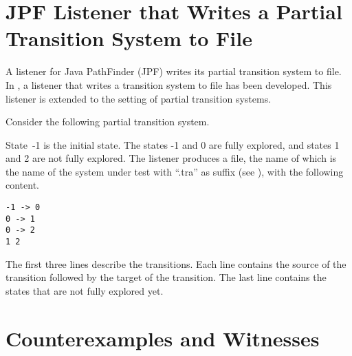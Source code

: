 \documentclass[12pt]{article}
\theoremstyle{definition}
\begin{document}
\section{JPF Listener that Writes a Partial Transition System to File}

A listener for Java PathFinder (JPF) writes its partial transition system to file.  In \cite[Section~7.3]{B20}, a listener that writes a transition system to file has been developed.  This listener is extended to the setting of partial transition systems.

Consider the following partial transition system.
\begin{center}
\end{center}
State~-1 is the initial state.  The states -1 and 0 are fully explored, and  states 1 and 2 are not fully explored.  The listener produces a file, the name of which is the name of the system under test with ``.tra'' as suffix (see \cite[Section 7.4]{B20}), with the following content.
\begin{verbatim}
-1 -> 0
0 -> 1
0 -> 2
1 2
\end{verbatim}
The first three lines describe the transitions.  Each line contains the source of the transition followed by the target of the transition.  The last line contains the states that are not fully explored yet.

\section{Counterexamples and Witnesses}



\end{document}
